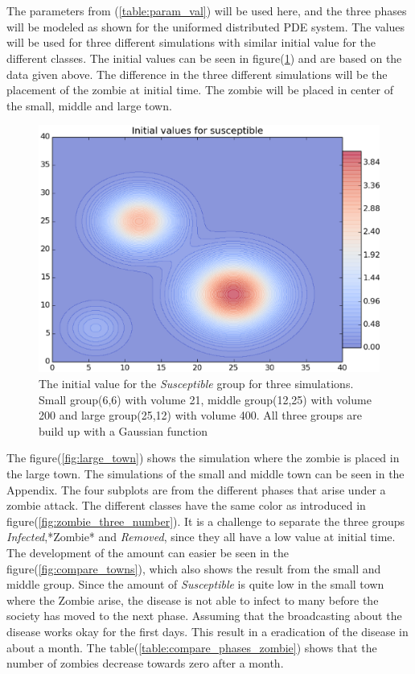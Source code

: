 \documentclass[%
twoside,                 %
final,                   %
10pt]{article}
\begin{document}
\noindent
\\
\\
The parameters from (\ref{table:param_val}) will be used here, and the three phases will be modeled as shown for the uniformed distributed PDE system. The values will be used for three different simulations with similar initial value for the different classes. The initial values can be seen in figure(\ref{fig:initial_value_susceptible}) and are based on the data given above. The difference in the three different simulations will be the placement of the zombie at initial time. The zombie will be placed in center of the small, middle and large town.


\begin{figure}[ht]
  \centerline{\includegraphics[width=0.8\linewidth]{plots/initial_value_susceptible.eps}}
  \caption{
  \label{fig:initial_value_susceptible} The initial value for the \emph{Susceptible} group for three simulations. Small group(6,6) with volume 21, middle group(12,25) with volume 200 and large group(25,12) with volume 400. All three groups are build up with a Gaussian function
  }
\end{figure}


The figure(\ref{fig:large_town}) shows the simulation where the zombie is placed in the large town. The simulations of the small and middle town can be seen in the Appendix. The four subplots are from the different phases that arise under a zombie attack. The different classes have the same color as introduced in figure(\ref{fig:zombie_three_number}). It is a challenge to separate the three groups \emph{Infected},*Zombie* and \emph{Removed}, since they all have a low value at initial time. The development of the amount can easier be seen in the figure(\ref{fig:compare_towns}), which also shows the result from the small and middle group. Since the amount of \emph{Susceptible} is quite low in the small town where the Zombie arise, the disease is not able to infect to many before the society has moved to the next phase. Assuming that the broadcasting about the disease works okay for the first days. This result in a eradication of the disease in about a month. The table(\ref{table:compare_phases_zombie}) shows that the number of zombies decrease towards zero after a month. 
\end{document}
